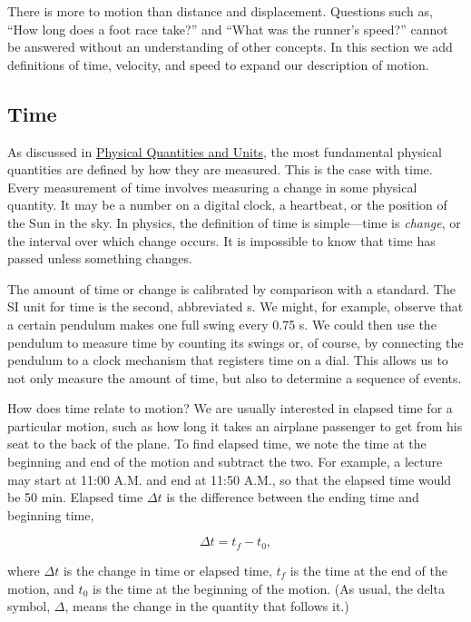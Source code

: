 \documentclass[
]{book}
\begin{document}
There is more to motion than distance and displacement. Questions such
as, ``How long does a foot race take?'' and ``What was the runner's
speed?'' cannot be answered without an understanding of other concepts.
In this section we add definitions of time, velocity, and speed to
expand our description of motion.

\hypertarget{fs-id1568419}{}
\hypertarget{time}{%
\subsection{Time}\label{time}}

As discussed in \href{/m54765}{Physical Quantities and Units}, the most
fundamental physical quantities are defined by how they are measured.
This is the case with time. Every measurement of time involves measuring
a change in some physical quantity. It may be a number on a digital
clock, a heartbeat, or the position of the Sun in the sky. In physics,
the definition of time is simple---\protect\hypertarget{import-auto-id2588516}{}{time} is \emph{change}, or the interval over which change occurs.
It is impossible to know that time has passed unless something changes.

The amount of time or change is calibrated by comparison with a
standard. The SI unit for time is the second, abbreviated s. We might,
for example, observe that a certain pendulum makes one full swing every
0.75 s. We could then use the pendulum to measure time by counting its
swings or, of course, by connecting the pendulum to a clock mechanism
that registers time on a dial. This allows us to not only measure the
amount of time, but also to determine a sequence of events.

How does time relate to motion? We are usually interested in elapsed
time for a particular motion, such as how long it takes an airplane
passenger to get from his seat to the back of the plane. To find elapsed
time, we note the time at the beginning and end of the motion and
subtract the two. For example, a lecture may start at 11:00
\textsc{A.M.} and end at 11:50 \textsc{A.M.}, so that the
elapsed time would be 50 min. \protect\hypertarget{import-auto-id4083152}{}{Elapsed time} \textbf{\({\Delta t}{}\)} is the difference between the
ending time and beginning time,

\leavevmode\hypertarget{import-auto-id1757927}{}%
\[\Delta t = {t_{f} - t_{0}},\]

where \({\Delta t}{}\) is the change in time or elapsed time, \(t_{f}{}\) is
the time at the end of the motion, and \(t_{0}{}\) is the time at the
beginning of the motion. (As usual, the delta symbol, \(\Delta{}\), means
the change in the quantity that follows it.)
\end{document}
